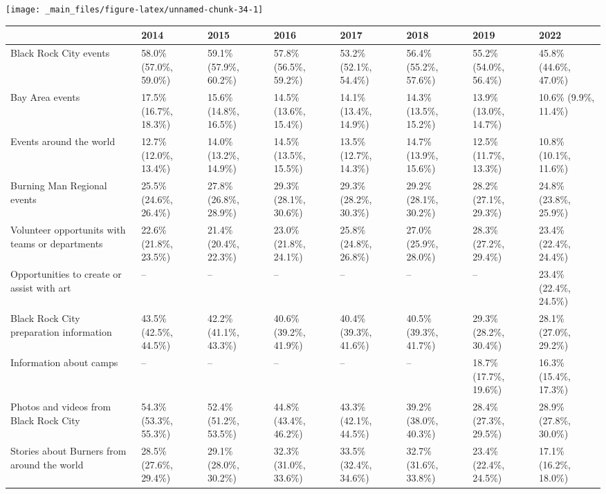 \documentclass[
]{book}
\begin{document}
\texttt{[image: \_main\_files/figure-latex/unnamed-chunk-34-1]}

\begin{table}
\centering
\begin{tabular}[t]{>{}l|>{}l|>{}l|>{}l|>{}l|>{}l|>{}l|>{}l}
\hline
  & 2014 & 2015 & 2016 & 2017 & 2018 & 2019 & 2022\\
\hline
Black Rock City events & 58.0\% (57.0\%, 59.0\%) & 59.1\% (57.9\%, 60.2\%) & 57.8\% (56.5\%, 59.2\%) & 53.2\% (52.1\%, 54.4\%) & 56.4\% (55.2\%, 57.6\%) & 55.2\% (54.0\%, 56.4\%) & 45.8\% (44.6\%, 47.0\%)\\
\hline
Bay Area events & 17.5\% (16.7\%, 18.3\%) & 15.6\% (14.8\%, 16.5\%) & 14.5\% (13.6\%, 15.4\%) & 14.1\% (13.4\%, 14.9\%) & 14.3\% (13.5\%, 15.2\%) & 13.9\% (13.0\%, 14.7\%) & 10.6\% (9.9\%, 11.4\%)\\
\hline
Events around the world & 12.7\% (12.0\%, 13.4\%) & 14.0\% (13.2\%, 14.9\%) & 14.5\% (13.5\%, 15.5\%) & 13.5\% (12.7\%, 14.3\%) & 14.7\% (13.9\%, 15.6\%) & 12.5\% (11.7\%, 13.3\%) & 10.8\% (10.1\%, 11.6\%)\\
\hline
Burning Man Regional events & 25.5\% (24.6\%, 26.4\%) & 27.8\% (26.8\%, 28.9\%) & 29.3\% (28.1\%, 30.6\%) & 29.3\% (28.2\%, 30.3\%) & 29.2\% (28.1\%, 30.2\%) & 28.2\% (27.1\%, 29.3\%) & 24.8\% (23.8\%, 25.9\%)\\
\hline
Volunteer opportunits with 
 teams or departments & 22.6\% (21.8\%, 23.5\%) & 21.4\% (20.4\%, 22.3\%) & 23.0\% (21.8\%, 24.1\%) & 25.8\% (24.8\%, 26.8\%) & 27.0\% (25.9\%, 28.0\%) & 28.3\% (27.2\%, 29.4\%) & 23.4\% (22.4\%, 24.4\%)\\
\hline
Opportunities to create 
 or assist with art & -- & -- & -- & -- & -- & -- & 23.4\% (22.4\%, 24.5\%)\\
\hline
Black Rock City preparation 
 information & 43.5\% (42.5\%, 44.5\%) & 42.2\% (41.1\%, 43.3\%) & 40.6\% (39.2\%, 41.9\%) & 40.4\% (39.3\%, 41.6\%) & 40.5\% (39.3\%, 41.7\%) & 29.3\% (28.2\%, 30.4\%) & 28.1\% (27.0\%, 29.2\%)\\
\hline
Information about camps & -- & -- & -- & -- & -- & 18.7\% (17.7\%, 19.6\%) & 16.3\% (15.4\%, 17.3\%)\\
\hline
Photos and videos from 
 Black Rock City & 54.3\% (53.3\%, 55.3\%) & 52.4\% (51.2\%, 53.5\%) & 44.8\% (43.4\%, 46.2\%) & 43.3\% (42.1\%, 44.5\%) & 39.2\% (38.0\%, 40.3\%) & 28.4\% (27.3\%, 29.5\%) & 28.9\% (27.8\%, 30.0\%)\\
\hline
Stories about Burners from 
 around the world & 28.5\% (27.6\%, 29.4\%) & 29.1\% (28.0\%, 30.2\%) & 32.3\% (31.0\%, 33.6\%) & 33.5\% (32.4\%, 34.6\%) & 32.7\% (31.6\%, 33.8\%) & 23.4\% (22.4\%, 24.5\%) & 17.1\% (16.2\%, 18.0\%)\\

\end{tabular}
\end{table}
\end{document}
